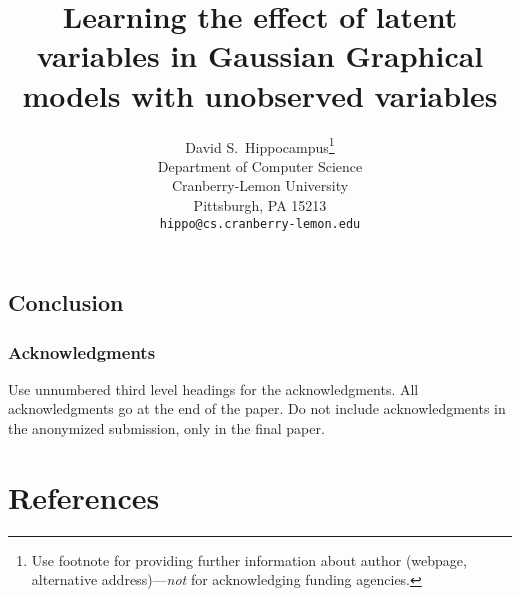 \documentclass{article}
\title{Learning the effect of latent variables in Gaussian Graphical models with unobserved variables}
\author{
  David S.~Hippocampus\thanks{Use footnote for providing further
    information about author (webpage, alternative
    address)---\emph{not} for acknowledging funding agencies.} \\
  Department of Computer Science\\
  Cranberry-Lemon University\\
  Pittsburgh, PA 15213 \\
  \texttt{hippo@cs.cranberry-lemon.edu} \\
}
\begin{document}

\maketitle

\begin{abstract}

\end{abstract}













\subsection*{Conclusion}

\subsubsection*{Acknowledgments}

Use unnumbered third level headings for the acknowledgments. All
acknowledgments go at the end of the paper. Do not include
acknowledgments in the anonymized submission, only in the final paper.

\section*{References}


\end{document}
